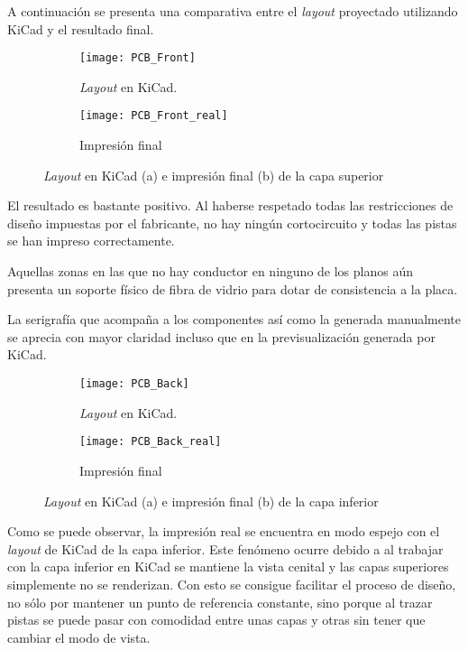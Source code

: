 A continuación se presenta una comparativa entre el \textit{layout} proyectado utilizando KiCad y el resultado final.

\begin{figure}[h]
  \begin{subfigure}[b]{8cm}
   	\centering
    \texttt{[image: PCB\_Front]}
    \caption{\textit{Layout} en KiCad.}
    \label{fig:PCB_Front}
  \end{subfigure}
  \hfill
  \begin{subfigure}[b]{8cm}
  	\centering
    \texttt{[image: PCB\_Front\_real]}
    \caption{Impresión final}
    \label{fig:PCB_Front_real}
  \end{subfigure}
  \caption{\textit{Layout} en KiCad (a) e impresión final (b) de la capa superior}
  \label{fig:PCB_Front_completa}
\end{figure}

El resultado es bastante positivo. Al haberse respetado todas las restricciones de diseño impuestas por el fabricante, no hay ningún cortocircuito y todas las pistas se han impreso correctamente.

Aquellas zonas en las que no hay conductor en ninguno de los planos aún presenta un soporte físico de fibra de vidrio para dotar de consistencia a la placa.

La serigrafía que acompaña a los componentes así como la generada manualmente se aprecia con mayor claridad incluso que en la previsualización generada por KiCad.

\clearpage

\begin{figure}[h]
  \begin{subfigure}[b]{8cm}
   	\centering
    \texttt{[image: PCB\_Back]}
    \caption{\textit{Layout} en KiCad.}
    \label{fig:PCB_Back}
  \end{subfigure}
  \hfill
  \begin{subfigure}[b]{8cm}
  	\centering
    \texttt{[image: PCB\_Back\_real]}
    \caption{Impresión final}
    \label{fig:PCB_Back_real}
  \end{subfigure}
  \caption{\textit{Layout} en KiCad (a) e impresión final (b) de la capa inferior}
  \label{fig:PCB_Back_completa}
\end{figure}

Como se puede observar, la impresión real se encuentra en modo espejo con el \textit{layout} de KiCad de la capa inferior. Este fenómeno ocurre debido a  al trabajar con la capa inferior en KiCad se mantiene la vista cenital y las capas superiores simplemente no se renderizan. Con esto se consigue facilitar el proceso de diseño, no sólo por mantener un punto de referencia constante, sino porque al trazar pistas se puede pasar con comodidad entre unas capas y otras sin tener que cambiar el modo de vista.


